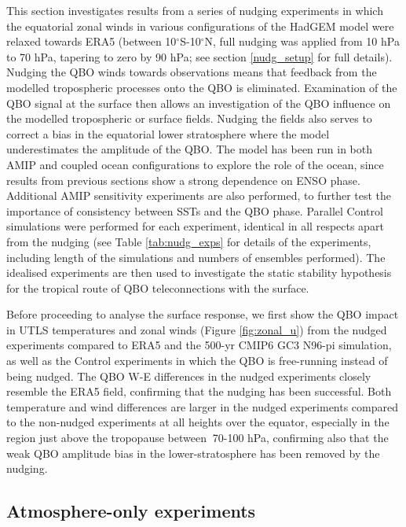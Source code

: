 This section investigates results from a series of nudging experiments in which the equatorial zonal winds in various configurations of the HadGEM model were relaxed towards ERA5 (between 10$^\circ$S-10$^\circ$N, full nudging was applied from 10 hPa to 70 hPa, tapering to zero by 90 hPa; see section \ref{nudg_setup} for full details). Nudging the QBO winds towards observations means that feedback from the modelled tropospheric processes onto the QBO is eliminated. Examination of the QBO signal at the surface then allows an investigation of the QBO influence on the modelled tropospheric or surface fields. Nudging the fields also serves to correct a bias in the equatorial lower stratosphere where the model underestimates the amplitude of the QBO. The model has been run in both AMIP and coupled ocean configurations to explore the role of the ocean, since results from previous sections show a strong dependence on ENSO phase. Additional AMIP sensitivity experiments are also performed, to further test the importance of consistency between SSTs and the QBO phase. Parallel Control simulations were performed for each experiment, identical in all respects apart from the nudging (see Table \ref{tab:nudg_exps} for details of the experiments, including length of the simulations and numbers of ensembles performed).  The idealised experiments are then used to investigate the static stability hypothesis for the tropical route of QBO teleconnections with the surface.  

Before proceeding to analyse the surface response, we first show the QBO impact in UTLS  
temperatures and zonal winds (Figure \ref{fig:zonal_u}) from the nudged experiments compared to ERA5 and the 500-yr CMIP6 GC3 N96-pi simulation, as well as the Control experiments in which the QBO is free-running instead of being nudged.  The QBO W-E differences in the nudged experiments closely resemble the ERA5 field, confirming that the nudging has been successful. Both temperature and wind differences are larger in the nudged experiments compared to the non-nudged experiments at all heights over the equator, especially in the region just above the tropopause between $~$70-100 hPa, confirming also that the weak QBO amplitude bias in the lower-stratosphere has  
been removed by the nudging.  

\subsection{Atmosphere-only experiments}


